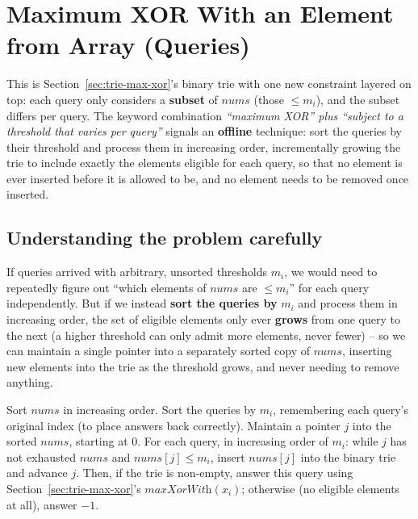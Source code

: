 \section{Maximum XOR With an Element from Array (Queries)}
\label{sec:trie-max-xor-query}


\begin{patternbox}
This is Section~\ref{sec:trie-max-xor}'s binary trie with one new
constraint layered on top: each query only considers a \textbf{subset}
of $\textit{nums}$ (those $\le m_i$), and the subset differs per query.
The keyword combination \emph{``maximum XOR'' plus ``subject to a
threshold that varies per query''} signals an \textbf{offline} technique:
sort the queries by their threshold and process them in increasing
order, incrementally growing the trie to include exactly the elements
eligible for each query, so that no element is ever inserted before it
is allowed to be, and no element needs to be removed once inserted.
\end{patternbox}

\subsection*{Understanding the problem carefully}

If queries arrived with arbitrary, unsorted thresholds $m_i$, we would
need to repeatedly figure out ``which elements of $\textit{nums}$ are
$\le m_i$'' for each query independently. But if we instead
\textbf{sort the queries by} $m_i$ and process them in increasing order,
the set of eligible elements only ever \textbf{grows} from one query to
the next (a higher threshold can only admit more elements, never fewer)
-- so we can maintain a single pointer into a separately sorted copy of
$\textit{nums}$, inserting new elements into the trie as the threshold
grows, and never needing to remove anything.

\begin{ideabox}
Sort $\textit{nums}$ in increasing order. Sort the queries by $m_i$,
remembering each query's original index (to place answers back
correctly). Maintain a pointer $j$ into the sorted $\textit{nums}$,
starting at $0$. For each query, in increasing order of $m_i$: while $j$
has not exhausted $\textit{nums}$ and $\textit{nums}[j] \le m_i$, insert
$\textit{nums}[j]$ into the binary trie and advance $j$. Then, if the
trie is non-empty, answer this query using
Section~\ref{sec:trie-max-xor}'s $\textit{maxXorWith}(x_i)$; otherwise
(no eligible elements at all), answer $-1$.
\end{ideabox}

